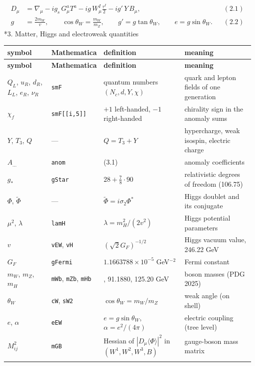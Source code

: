\documentclass[10pt,a4paper]{article}
\makeatletter
\renewcommand\section{\@startsection{section}{1}{\z@}{-3.5ex \@plus -1ex \@minus -.2ex}{2.3ex \@plus.2ex}{\normalfont\Large\bfseries\raggedright}}
\makeatother
\begin{document}
\begin{align*}
D_\mu&=\nabla_\mu-ig_s\,G^a_\mu T^a-ig\,W^I_\mu\tfrac{\tau^I}2-ig'\,Y\,B_\mu,&&(2.1) \\
g&=\frac{2m_W}{v},\qquad \cos\theta_W=\frac{m_W}{m_Z},\qquad g'=g\tan\theta_W,\qquad e=g\sin\theta_W .&&(2.2)
\end{align*}
\section*{3. Matter, Higgs and electroweak quantities}
{\small
\begin{longtable}{>{\raggedright\arraybackslash}p{}>{\raggedright\arraybackslash}p{}>{\raggedright\arraybackslash}p{}>{\raggedright\arraybackslash}p{}}
\toprule
\textbf{symbol} & \textbf{Mathematica} & \textbf{definition} & \textbf{meaning} \\
\midrule\endfirsthead
\toprule
\textbf{symbol} & \textbf{Mathematica} & \textbf{definition} & \textbf{meaning} \\
\midrule\endhead
\endfoot
\bottomrule\endlastfoot
$Q_L$, $u_R$, $d_R$, $L_L$, $e_R$, $\nu_R$ & \texttt{smF} & quantum numbers $(N_c,d,Y,\chi)$ & quark and lepton fields of one generation \\
$\chi_f$ & \texttt{smF[[i,5]]} & $+1$ left-handed, $-1$ right-handed & chirality sign in the anomaly sums \\
$Y$, $T_3$, $Q$ & — & $Q=T_3+Y$ & hypercharge, weak isospin, electric charge \\
$A_{\dots}$ & \texttt{anom} & (3.1) & anomaly coefficients \\
$g_*$ & \texttt{gStar} & $28+\frac78\cdot90$ & relativistic degrees of freedom (106.75) \\
$\Phi$, $\tilde\Phi$ & — & $\tilde\Phi=i\sigma_2\Phi^*$ & Higgs doublet and its conjugate \\
$\mu^2$, $\lambda$ & \texttt{lamH} & $\lambda=m_H^2/(2v^2)$ & Higgs potential parameters \\
$v$ & \texttt{vEW}, \texttt{vH} & $(\sqrt2G_F)^{-1/2}$ & Higgs vacuum value, 246.22 GeV \\
$G_F$ & \texttt{gFermi} & $1.1663788\times10^{-5}$ GeV$^{-2}$ & Fermi constant \\
$m_W$, $m_Z$, $m_H$ & \texttt{mWb}, \texttt{mZb}, \texttt{mHb} & 80.3692, 91.1880, 125.20 GeV & boson masses (PDG 2025) \\
$\theta_W$ & \texttt{cW}, \texttt{sW2} & $\cos\theta_W=m_W/m_Z$ & weak angle (on shell) \\
$e$, $\alpha$ & \texttt{eEW} & $e=g\sin\theta_W$, $\alpha=e^2/(4\pi)$ & electric coupling (tree level) \\
$M^2_{ij}$ & \texttt{mGB} & Hessian of $|D_\mu\langle\Phi\rangle|^2$ in $(W^1,W^2,W^3,B)$ & gauge-boson mass matrix \\*
\end{longtable}}
\end{document}
